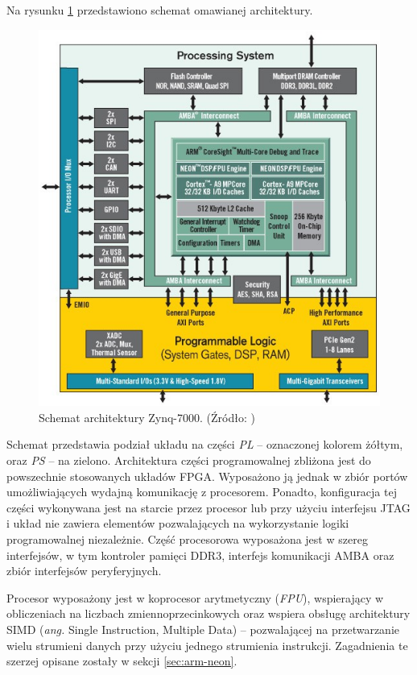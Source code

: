 Na rysunku \ref{fig:zynq-overview} przedstawiono schemat omawianej architektury.

\begin{figure}[h]
	\centering
	\includegraphics[width=12cm]{img/zyng-platform.png}
	\caption{Schemat architektury Zynq-7000. (Źródło: \cite{zybo-reference-manual})}
	\label{fig:zynq-overview}
\end{figure}

Schemat przedstawia podział układu na części \emph{PL} -- oznaczonej kolorem żółtym, oraz \emph{PS} -- na zielono.
Architektura części programowalnej zbliżona jest do powszechnie stosowanych układów FPGA. %
Wyposażono ją jednak w zbiór portów umożliwiających wydajną komunikację z procesorem. 
Ponadto, konfiguracja tej części wykonywana jest na starcie przez procesor lub przy użyciu interfejsu JTAG i układ nie zawiera elementów pozwalających na wykorzystanie logiki programowalnej niezależnie.
Część procesorowa wyposażona jest w szereg interfejsów, w tym kontroler pamięci DDR3, interfejs komunikacji AMBA oraz zbiór interfejsów peryferyjnych.

Procesor wyposażony jest w koprocesor arytmetyczny (\emph{FPU}), wspierający w obliczeniach na liczbach zmiennoprzecinkowych oraz wspiera obsługę architektury SIMD (\emph{ang.} Single Instruction, Multiple Data) -- pozwalającej na przetwarzanie wielu strumieni danych przy użyciu jednego strumienia instrukcji. 
Zagadnienia te szerzej opisane zostały w sekcji \ref{sec:arm-neon}.

